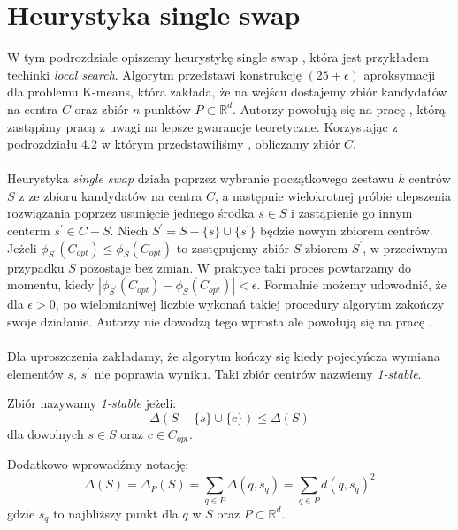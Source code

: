 \section{Heurystyka single swap}

W tym podrozdziale opiszemy heurystykę single swap \cite{Arya2004LocalSH}, która jest przykładem techinki \textit{local search}.
Algorytm przedstawi konstrukcję $(25 + \epsilon)$ aproksymacji dla problemu K-means, która zakłada, że na wejścu dostajemy zbiór kandydatów na centra $C$ oraz zbiór $n$ punktów $P \subset \mathbb{R}^d$.
Autorzy powołują się na pracę \cite{Matousek99onapproximate}, którą zastąpimy pracą \cite{10.1145/1007352.1007400} z uwagi na lepsze gwarancje teoretyczne.
Korzystając z podrozdziału 4.2 w którym przedstawiliśmy \cite{10.1145/1007352.1007400}, obliczamy zbiór $C$.
\\~\\
Heurystyka \textit{single swap} działa poprzez wybranie początkowego zestawu $k$ centrów $S$ z ze zbioru kandydatów na centra $C$, a następnie wielokrotnej
próbie ulepszenia rozwiązania poprzez usunięcie jednego środka $s \in S$ i zastąpienie go innym centerm $s^{'} \in C - S$.
Niech $S^{'} = S - \{s\} \cup \{s^{'}\}$ będzie nowym zbiorem centrów.
Jeżeli $\phi_{S^{'}}(C_{opt}) \leq \phi_{S}(C_{opt})$ to zastępujemy zbiór $S$ zbiorem $S^{'}$, w przeciwnym przypadku $S$ pozostaje bez zmian.
W praktyce taki proces powtarzamy do momentu, kiedy $|\phi_{S^{'}}(C_{opt}) - \phi_{S}(C_{opt})| < \epsilon$.
Formalnie możemy udowodnić, że dla $\epsilon > 0$, po wielomianiwej liczbie wykonań takiej procedury algorytm zakończy swoje działanie.
Autorzy nie dowodzą tego wprosta ale powołują się na pracę \cite{10.1145/380752.380755}.
\\~\\
Dla uproszczenia zakładamy, że algorytm kończy się kiedy pojedyńcza wymiana elementów $s$, $s^{'}$ nie poprawia wyniku.
Taki zbiór centrów nazwiemy \textit{1-stable}.
\begin{definition}
    Zbiór nazywamy \emph{1-stable} jeżeli:
    \begin{equation}
        \Delta(S - \{s\} \cup \{c\}) \leq \Delta(S)
    \end{equation}
    dla dowolnych $s \in S$ oraz $c \in C_{opt}$.
\end{definition}

\noindent
Dodatkowo wprowadźmy notację:
\begin{equation}
    \Delta(S) = \Delta_{P}(S) = \sum_{q \in P} \Delta(q,s_{q}) = \sum_{q \in P} d(q, s_{q})^{2}
\end{equation}
gdzie $s_{q}$ to najbliższy punkt dla $q$ w $S$ oraz $P \subset \mathbb{R}^{d}$.

